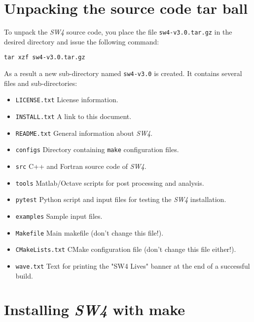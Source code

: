 \documentclass[11pt]{article}
\begin{document}
\section{Unpacking the source code tar ball}

To unpack the \emph{SW4} source code, you place the file \verb+sw4-v3.0.tar.gz+ in the
desired directory and issue the following command:
\begin{verbatim}
tar xzf sw4-v3.0.tar.gz
\end{verbatim}
As a result a new sub-directory named \verb+sw4-v3.0+ is created. It contains several files
and sub-directories:
%
\begin{itemize}
\item \verb+LICENSE.txt+ License information.
\item \verb+INSTALL.txt+ A link to this document.
\item \verb+README.txt+ General information about \emph{SW4}.
\item \verb+configs+ Directory containing \verb+make+ configuration files.
\item \verb+src+ C++ and Fortran source code of \emph{SW4}.
\item \verb+tools+ Matlab/Octave scripts for post processing and analysis.
\item \verb+pytest+ Python script and input files for testing the \emph{SW4} installation.
\item \verb+examples+ Sample input files.
\item \verb+Makefile+ Main makefile (don't change this file!).
\item \verb+CMakeLists.txt+ CMake configuration file (don't change this file either!).
\item \verb+wave.txt+ Text for printing the "SW4 Lives" banner at the end of a successful build.
\end{itemize}

\section{Installing \emph{SW4} with make}\label{cha:installing-sw4}

\end{document}
